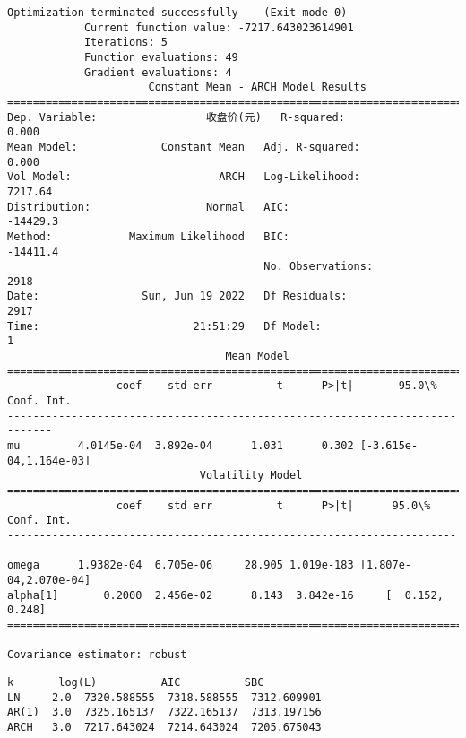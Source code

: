 \documentclass[11pt]{article}
\makeatletter
\newcommand{\boxspacing}{\kern\kvtcb@left@rule\kern\kvtcb@boxsep}
\newcommand{\prompt}[4]{
        {\ttfamily\llap{{\color{#2}[#3]:\hspace{3pt}#4}}\vspace{-\baselineskip}}
    }
\makeatother
\begin{document}
    \begin{Verbatim}[commandchars=\\\{\}]
Optimization terminated successfully    (Exit mode 0)
            Current function value: -7217.643023614901
            Iterations: 5
            Function evaluations: 49
            Gradient evaluations: 4
                      Constant Mean - ARCH Model Results
==============================================================================
Dep. Variable:                 收盘价(元)   R-squared:                       0.000
Mean Model:             Constant Mean   Adj. R-squared:                  0.000
Vol Model:                       ARCH   Log-Likelihood:                7217.64
Distribution:                  Normal   AIC:                          -14429.3
Method:            Maximum Likelihood   BIC:                          -14411.4
                                        No. Observations:                 2918
Date:                Sun, Jun 19 2022   Df Residuals:                     2917
Time:                        21:51:29   Df Model:                            1
                                  Mean Model
=============================================================================
                 coef    std err          t      P>|t|       95.0\% Conf. Int.
-----------------------------------------------------------------------------
mu         4.0145e-04  3.892e-04      1.031      0.302 [-3.615e-04,1.164e-03]
                              Volatility Model
============================================================================
                 coef    std err          t      P>|t|      95.0\% Conf. Int.
----------------------------------------------------------------------------
omega      1.9382e-04  6.705e-06     28.905 1.019e-183 [1.807e-04,2.070e-04]
alpha[1]       0.2000  2.456e-02      8.143  3.842e-16     [  0.152,  0.248]
============================================================================

Covariance estimator: robust
    \end{Verbatim}

            \begin{tcolorbox}[breakable, size=fbox, boxrule=.5pt, pad at break*=1mm, opacityfill=0]
\prompt{Out}{outcolor}{4}{\boxspacing}
\begin{Verbatim}[commandchars=\\\{\}]
         k       log(L)          AIC          SBC
LN     2.0  7320.588555  7318.588555  7312.609901
AR(1)  3.0  7325.165137  7322.165137  7313.197156
ARCH   3.0  7217.643024  7214.643024  7205.675043
\end{Verbatim}
\end{tcolorbox}
\end{document}

